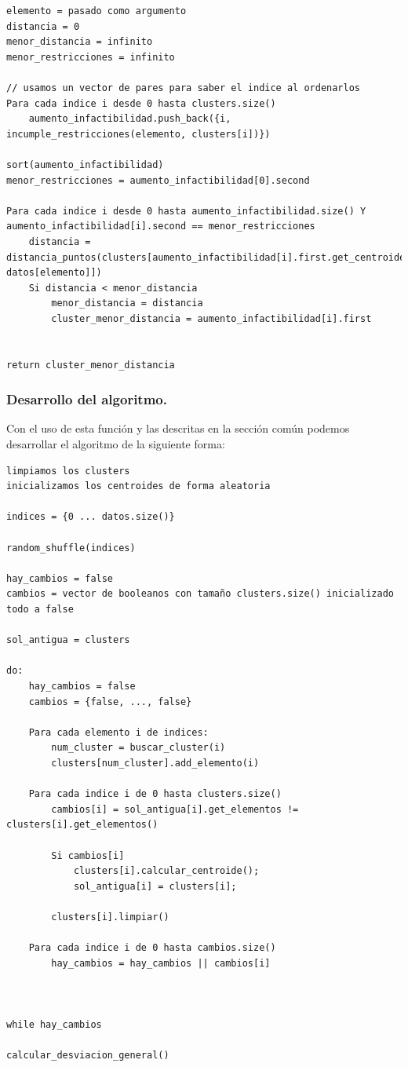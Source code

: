 \documentclass[12pt, spanish]{article}
\begin{document}
\begin{lstlisting}
elemento = pasado como argumento
distancia = 0
menor_distancia = infinito
menor_restricciones = infinito

// usamos un vector de pares para saber el indice al ordenarlos
Para cada indice i desde 0 hasta clusters.size()
	aumento_infactibilidad.push_back({i, incumple_restricciones(elemento, clusters[i])})

sort(aumento_infactibilidad)
menor_restricciones = aumento_infactibilidad[0].second

Para cada indice i desde 0 hasta aumento_infactibilidad.size() Y aumento_infactibilidad[i].second == menor_restricciones
	distancia = distancia_puntos(clusters[aumento_infactibilidad[i].first.get_centroide(), datos[elemento]])
	Si distancia < menor_distancia
		menor_distancia = distancia
		cluster_menor_distancia = aumento_infactibilidad[i].first


return cluster_menor_distancia
\end{lstlisting}


\subsubsection{Desarrollo del algoritmo.}

Con el uso de esta función y las descritas en la sección común podemos desarrollar el algoritmo de la siguiente forma:

\begin{lstlisting}
limpiamos los clusters
inicializamos los centroides de forma aleatoria

indices = {0 ... datos.size()}

random_shuffle(indices)

hay_cambios = false
cambios = vector de booleanos con tamaño clusters.size() inicializado todo a false

sol_antigua = clusters

do:
	hay_cambios = false
	cambios = {false, ..., false}
	
	Para cada elemento i de indices:
		num_cluster = buscar_cluster(i)
		clusters[num_cluster].add_elemento(i)
		
	Para cada indice i de 0 hasta clusters.size()
		cambios[i] = sol_antigua[i].get_elementos != clusters[i].get_elementos()
		
		Si cambios[i]
			clusters[i].calcular_centroide();
			sol_antigua[i] = clusters[i];
			
		clusters[i].limpiar()
		
	Para cada indice i de 0 hasta cambios.size()
		hay_cambios = hay_cambios || cambios[i]



while hay_cambios

calcular_desviacion_general()
\end{lstlisting}
\end{document}
